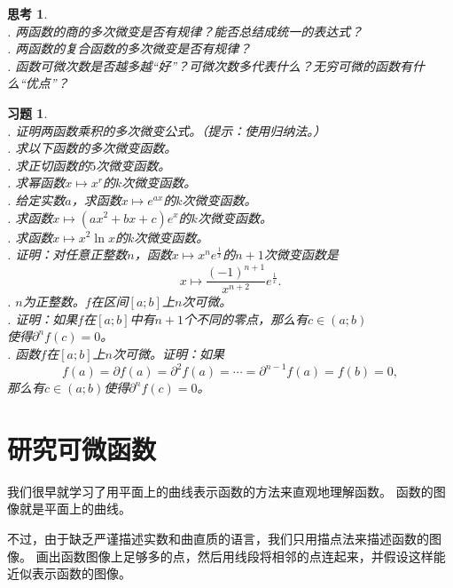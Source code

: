 \documentclass[12pt,UTF8]{ctexbook}
\theoremstyle{definition}
\theoremstyle{plain}
\newtheorem{sk}{思考}[section]
\newtheorem{xt}{习题}[section]
\begin{document}
\begin{sk}
    \mbox{} \\
    . 两函数的商的多次微变是否有规律？能否总结成统一的表达式？\\
    . 两函数的复合函数的多次微变是否有规律？\\
    . 函数可微次数是否越多越“好”？可微次数多代表什么？无穷可微的函数有什么“优点”？
\end{sk}

\begin{xt}
    \mbox{} \\
    . 证明两函数乘积的多次微变公式。（提示：使用归纳法。）\\
    . 求以下函数的多次微变函数。\\
    . 求正切函数的$5$次微变函数。\\
    . 求幂函数$x\mapsto x^r$的$k$次微变函数。\\
    . 给定实数$a$，求函数$x\mapsto e^{ax}$的$k$次微变函数。\\
    . 求函数$x \mapsto (ax^2 + bx + c)e^x$的$k$次微变函数。\\
    . 求函数$x \mapsto x^2\ln{x}$的$k$次微变函数。\\
    . 证明：对任意正整数$n$，函数$x\mapsto x^n e^{\frac{1}{x}}$的$n+1$次微变函数是
    $$x\mapsto \frac{(-1)^{n+1}}{x^{n+2}}e^{\frac{1}{x}}.$$
    . $n$为正整数。$f$在区间$[a; b]$上$n$次可微。\\
    . 证明：如果$f$在$[a; b]$中有$n+1$个不同的零点，那么有$c\in(a; b)$\\
    \indent 使得$\partial^n f(c) = 0$。\\
    . 函数$f$在$[a; b]$上$n$次可微。证明：如果
    $$f(a) = \partial f(a) = \partial^2 f(a) = \cdots = \partial^{n-1} f(a) = f(b) = 0,$$
    \indent 那么有$c\in(a; b)$使得$\partial^n f(c) = 0$。\\
\end{xt}

\chapter{研究可微函数}

我们很早就学习了用平面上的曲线表示函数的方法来直观地理解函数。
函数的图像就是平面上的曲线。

不过，由于缺乏严谨描述实数和曲直质的语言，我们只用描点法来描述函数的图像。
画出函数图像上足够多的点，然后用线段将相邻的点连起来，并假设这样能近似表示函数的图像。
\end{document}

